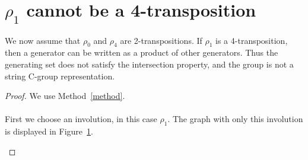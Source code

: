 \section{$\rho_1$ cannot be a 4-transposition}

\begin{lemma}
  \label{exclude-1}
  We now assume that $\rho_0$ and $\rho_4$ are 2-transpositions.
  If $\rho_1$ is a 4-transposition, then a generator can be written as a product of other generators. Thus the generating set does not satisfy the intersection property, and the group is not a string C-group representation.
\end{lemma}

\begin{proof}
We use Method~\ref{method}.

\paragraph{}
First we choose an involution, in this case $\rho_1$. The graph with only this involution is displayed in Figure~\ref{proof-5-1}.

\begin{figure}[H]
  \begin{center}
    \caption{}
    \label{proof-5-1}
  \end{center}
\end{figure}


\end{proof}
